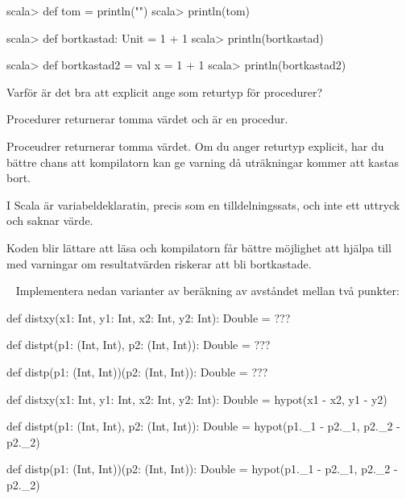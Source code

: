 \Subtask
\begin{REPL}
scala> def tom = println("")
scala> println(tom)
\end{REPL}

\Subtask
\begin{REPL}
scala> def bortkastad: Unit = 1 + 1
scala> println(bortkastad)
\end{REPL}

\Subtask
\begin{REPL}
scala> def bortkastad2 = { val x = 1 + 1 }
scala> println(bortkastad2)
\end{REPL}

\Subtask Varför är det bra att explicit ange  som returtyp för procedurer?

\SOLUTION


\TaskSolved \what


\SubtaskSolved Procedurer returnerar tomma värdet och  är en procedur.

\SubtaskSolved Proceudrer returnerar tomma värdet. Om du anger returtyp  explicit, har du bättre chans att kompilatorn kan ge varning då uträkningar kommer att kastas bort.

\SubtaskSolved I Scala är variabeldeklaratin, precis som en tilldelningssats, och inte ett uttryck och saknar värde.

\SubtaskSolved  Koden blir lättare att läsa och kompilatorn får bättre möjlighet att hjälpa till med varningar om resultatvärden riskerar att bli bortkastade.

\QUESTEND








\QUESTBEGIN

\Task  \what~ Implementera nedan varianter av beräkning av avståndet mellan två punkter:
\begin{Code}
def distxy(x1: Int, y1: Int, x2: Int, y2: Int): Double = ???

def distpt(p1: (Int, Int), p2: (Int, Int)): Double = ???

def distp(p1: (Int, Int))(p2: (Int, Int)): Double = ???

\end{Code}

\SOLUTION

\TaskSolved \what

\begin{Code}
def distxy(x1: Int, y1: Int, x2: Int, y2: Int): Double =
  hypot(x1 - x2, y1 - y2)

def distpt(p1: (Int, Int), p2: (Int, Int)): Double =
  hypot(p1._1 - p2._1, p2._2 - p2._2)

def distp(p1: (Int, Int))(p2: (Int, Int)): Double =
  hypot(p1._1 - p2._1, p2._2 - p2._2)
\end{Code}

